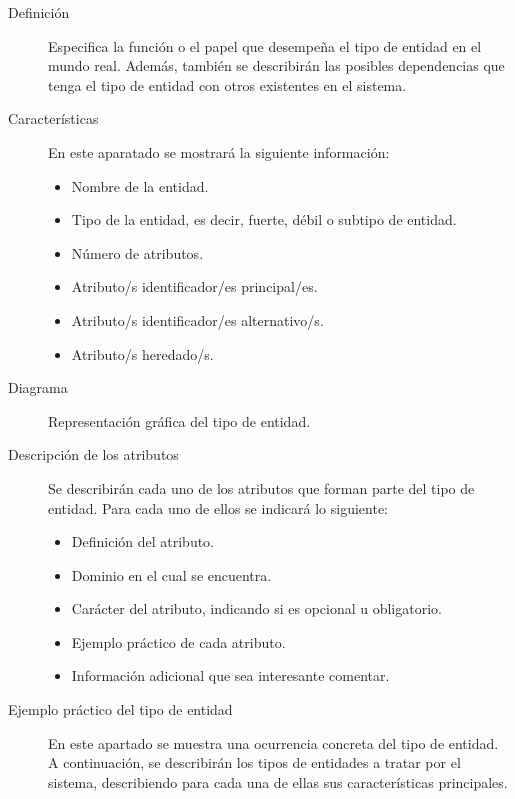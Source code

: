    \begin{description}
      \item[Definición] Especifica la función o el papel que desempeña el tipo
           de entidad en el mundo real. Además, también se describirán las
           posibles dependencias que tenga el tipo de entidad con otros
           existentes en el sistema.

      \item[Características] En este aparatado se mostrará la siguiente
           información:

            \begin{itemize}
             \item Nombre de la entidad.
             \item Tipo de la entidad, es decir, fuerte, débil o subtipo de
                   entidad.
             \item Número de atributos.
             \item Atributo/s identificador/es principal/es.
             \item Atributo/s identificador/es alternativo/s.
             \item Atributo/s heredado/s.
            \end{itemize}

      \item[Diagrama] Representación gráfica del tipo de entidad.

      \item[Descripción de los atributos] Se describirán cada uno de los
           atributos que forman parte del tipo de entidad. Para cada uno de
           ellos se indicará lo siguiente:

           \begin{itemize}
            \item Definición del atributo.
            \item Dominio en el cual se encuentra.
            \item Carácter del atributo, indicando si es opcional u obligatorio.
            \item Ejemplo práctico de cada atributo.
            \item Información adicional que sea interesante comentar.
           \end{itemize}

      \item[Ejemplo práctico del tipo de entidad] En este apartado se muestra
           una ocurrencia concreta del tipo de entidad. A continuación, se
           describirán los tipos de entidades a tratar por el sistema,
           describiendo para cada una de ellas sus características principales.

   \end{description}